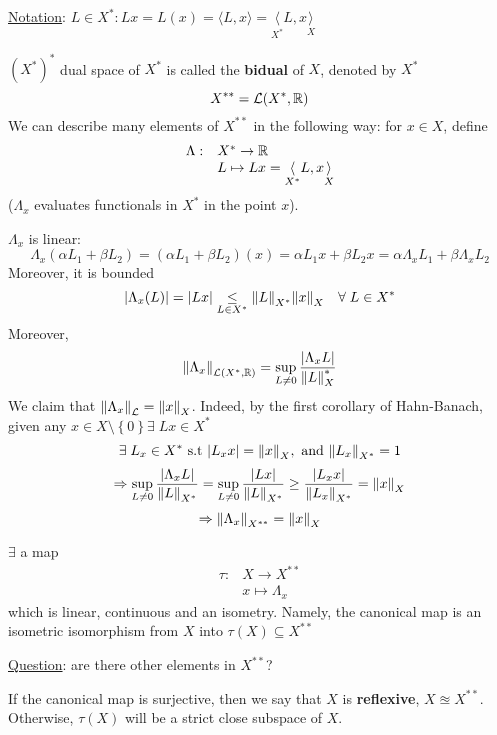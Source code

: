 \noindent \underline{Notation}: \(L \in X^*: Lx = L(x) = \langle L,x \rangle = \underset{X^*}{\langle}L,x\underset{X}{\rangle}\)

\((X^*)^*\) dual space of \(X^*\) is called the \textbf{bidual} of \(X\), denoted by \(X^*\)
\[
    X^{**} = \mathcal{L}(X^*, \mathbb{R})
\]
We can describe many elements of \(X^{**}\) in the following way: for \(x \in X\), define 
\[
    \begin{array}{ll}
        \Lambda: & X^* \to \mathbb{R} \\
        & L \mapsto Lx = \underset{X^*}{\langle}L,x\underset{X}{\rangle}
    \end{array}
\]
(\(\Lambda_x\) evaluates functionals in \(X^*\) in the point \(x\)).

\(\Lambda_x\) is linear:
\[
    \Lambda_x (\alpha L_1 + \beta L_2) = (\alpha L_1 + \beta L_2)(x) = \alpha L_1 x + \beta L_2 x = \alpha \Lambda_x L_1 + \beta \Lambda_x L_2
\]
Moreover, it is bounded 
\[
    \abs{\Lambda_x(L)} = \abs{Lx} \underset{L \in X^*}{\leq} \norm{L}_{X^*}\norm{x}_X \quad \forall \; L \in X^*
\]
Moreover, 
\[
    \norm{\Lambda_x}_{\mathcal{L}(X^*, \mathbb{R})} = \sup_{L \neq 0} \frac{\abs{\Lambda_x L}}{\norm{L}_X^*}
\]
We claim that \(\norm{\Lambda_x}_{\mathcal{L}} = \norm{x}_X\). Indeed, by the first corollary of Hahn-Banach, given any \(x \in X\setminus \left\{ 0 \right\} \exists \; Lx \in X^*\) 
\[
    \exists \; L_x \in X^* \mbox{ s.t } \abs{L_x x} = \norm{x}_X, \mbox{ and } \norm{L_x}_{X^*} = 1 
\]
\[
    \Rightarrow \sup_{L \neq 0} \frac{\abs{\Lambda_x L}}{\norm{L}_{X^*}} = \sup_{L \neq 0} \frac{\abs{Lx}}{\norm{L}_{X^*}} \geq \frac{\abs{L_x x}}{\norm{L_x}_{X^*}} = \norm{x}_X 
\]
\[
    \Rightarrow \norm{\Lambda_x}_{X^{**}} = \norm{x}_X
\]
\begin{theorem}
    \(\exists\) a map 
    \[
        \begin{array}{lc}
            \tau : & X \to X^{**} \\
            & x \mapsto \Lambda_x
        \end{array}
    \tag*{(Canonical Map)}\]
    which is linear, continuous and an isometry. Namely, the canonical map is an isometric isomorphism from \(X\) into \(\tau(X) \subseteq X^{**}\)
\end{theorem}
\noindent\underline{Question}: are there other elements in \(X^{**}\)?
\begin{definition}
    If the canonical map is surjective, then we say that \(X\) is \textbf{reflexive}, \(X \approxeq X^{**}\). Otherwise, \(\tau(X)\) will be a strict close subspace of \(X\).
\end{definition}
